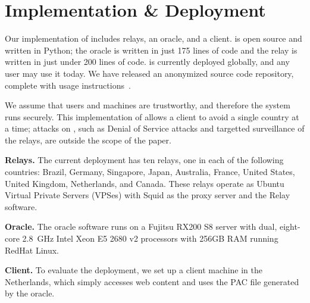 \section{Implementation \& Deployment}

Our implementation of \system{} includes relays, an oracle, and 
a client. \system{} is open source and written in Python; the oracle is written in just 
175 lines of code and the relay is written in just under 200 lines of code.  \system{} is currently deployed globally, and
any user may use it today.  We have released an anonymized source code repository,
complete with usage instructions~\cite{ran_system}.

We assume that users and machines are trustworthy, and therefore the system runs 
securely.  This implementation of \system{} allows a client to avoid a single country 
at a time; attacks on \system{}, such as Denial of Service attacks and targetted 
surveillance of the relays, are outside the scope of the paper.

{\bf Relays.}  The current deployment has ten relays, one in each
of the following
countries: Brazil,  Germany, Singapore, Japan, Australia, France, United
States, United Kingdom, Netherlands, and Canada.  These relays operate
as Ubuntu Virtual Private Servers (VPSes) with Squid as the proxy
server and the \system{} Relay software.


{\bf Oracle.}  The oracle software runs on a Fujitsu RX200 S8 server with dual, 
eight-core 2.8~GHz Intel Xeon E5 2680 v2 processors with 256GB RAM running 
RedHat Linux. 

{\bf Client.} To evaluate the \system{} deployment, we set up a client 
machine in the Netherlands, which simply accesses web content and uses the PAC 
file generated by the oracle. 



